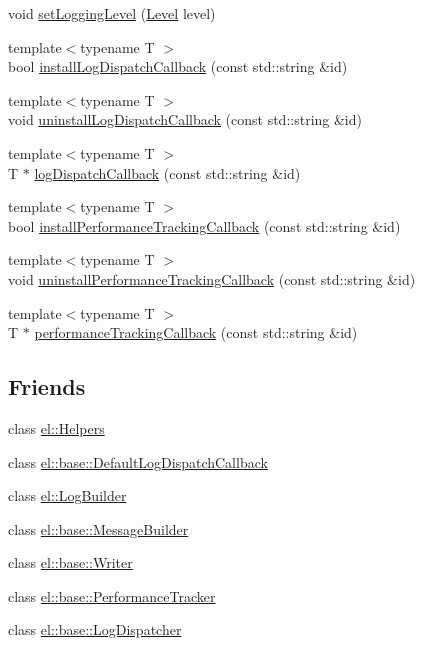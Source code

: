 \begin{DoxyCompactItemize}
void \hyperlink{classel_1_1base_1_1_storage_a163473357c32184769e8edd993c8b440}{set\+Logging\+Level} (\hyperlink{namespaceel_ab0ac6091262344c52dd2d3ad099e8e36}{Level} level)
\item 
{\footnotesize template$<$typename T $>$ }\\bool \hyperlink{classel_1_1base_1_1_storage_aec36c8e770c0ac354e74d57aba1cfa03}{install\+Log\+Dispatch\+Callback} (const std\+::string \&id)
\item 
{\footnotesize template$<$typename T $>$ }\\void \hyperlink{classel_1_1base_1_1_storage_a34c2c9f8abff647e22e1ee0b52357f88}{uninstall\+Log\+Dispatch\+Callback} (const std\+::string \&id)
\item 
{\footnotesize template$<$typename T $>$ }\\T $\ast$ \hyperlink{classel_1_1base_1_1_storage_a408d2420169a7f7286552fd153967b8d}{log\+Dispatch\+Callback} (const std\+::string \&id)
\item 
{\footnotesize template$<$typename T $>$ }\\bool \hyperlink{classel_1_1base_1_1_storage_ad95b77123066f0a49817155dd75583b5}{install\+Performance\+Tracking\+Callback} (const std\+::string \&id)
\item 
{\footnotesize template$<$typename T $>$ }\\void \hyperlink{classel_1_1base_1_1_storage_a0e69baf4bf3140fb7bc88bb386d933cf}{uninstall\+Performance\+Tracking\+Callback} (const std\+::string \&id)
\item 
{\footnotesize template$<$typename T $>$ }\\T $\ast$ \hyperlink{classel_1_1base_1_1_storage_aa511779589370416030d9fc1149a32fd}{performance\+Tracking\+Callback} (const std\+::string \&id)
\end{DoxyCompactItemize}
\subsection*{Friends}
\begin{DoxyCompactItemize}
\item 
class \hyperlink{classel_1_1base_1_1_storage_a2fb8a2c02cbf86247f093c118bed877a}{el\+::\+Helpers}
\item 
class \hyperlink{classel_1_1base_1_1_storage_a42b1de96d584ae4fecbfc2b9aff95052}{el\+::base\+::\+Default\+Log\+Dispatch\+Callback}
\item 
class \hyperlink{classel_1_1base_1_1_storage_a8c584bcf767a4d007311a7408b22ad62}{el\+::\+Log\+Builder}
\item 
class \hyperlink{classel_1_1base_1_1_storage_a81bbf6fe31fab133d182efa8367304f1}{el\+::base\+::\+Message\+Builder}
\item 
class \hyperlink{classel_1_1base_1_1_storage_a7a728edbb2761d151832daa74d5b2736}{el\+::base\+::\+Writer}
\item 
class \hyperlink{classel_1_1base_1_1_storage_a6a4d7851e1984800be3c230f06a79528}{el\+::base\+::\+Performance\+Tracker}
\item 
class \hyperlink{classel_1_1base_1_1_storage_a9b37b28ea1c5f8f862cc89f135711d92}{el\+::base\+::\+Log\+Dispatcher}
\end{DoxyCompactItemize}
